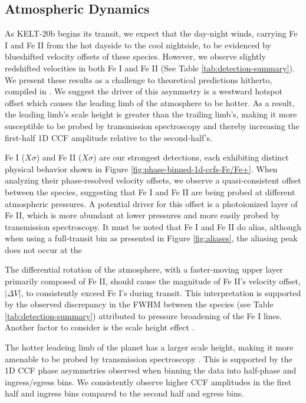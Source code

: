 \documentclass[twocolumn]{aastex631}
\begin{document}
            \clearpage
            
        \subsection{Atmospheric Dynamics}\label{subsec:Atmospheric Dynamics}
            As KELT-20b begins its transit, we expect that the day-night winds, carrying Fe I and Fe II from the hot dayside to the cool nightside, to be evidenced by blueshifted velocity offsets of these species. However, we observe slightly redshifted velocities in both Fe I and Fe II (See Table \ref{tab:detection-summary}). We present these results as a challenge to theoretical predictions hitherto, compiled in \citet{Savel2023}. We suggest the driver of this asymmetry is a westward hotspot offset which causes the leading limb of the atmosphere to be hotter. As a result, the leading limb's scale height is greater than the trailing limb's, making it more susceptible to be probed by transmission spectroscopy and thereby increasing the first-half 1D CCF amplitude relative to the second-half's.
    
            Fe I ($X\sigma$) and Fe II ($X\sigma$) are our strongest detections, each exhibiting distinct physical behavior shown in Figure \ref{fig:phase-binned-1d-ccfs-Fe/Fe+}. When analyzing their phase-resolved velocity offsets, we observe a quasi-consistent offset between the species, suggesting that Fe I and Fe II are being probed at different atmospheric pressures. A potential driver for this offset is a photoionized layer of Fe II, which is more abundant at lower pressures and more easily probed by transmission spectroscopy. It must be noted that Fe I and Fe II do alias, although when using a full-transit bin as presented in Figure \ref{fig:aliases}, the aliasing peak does not occur at the 
            
            The differential rotation of the atmosphere, with a faster-moving upper layer primarily composed of Fe II, should cause the magnitude of Fe II's velocity offset, $|\Delta V|$, to consistently exceed Fe I's during transit. This interpretation is supported by the observed discrepancy in the FWHM between the species (see Table \ref{tab:detection-summary}) attributed to pressure broadening of the Fe I lines. Another factor to consider is the scale height effect \citep{Savel2023}. 
            
            The hotter leadeing limb of the planet has a larger scale height, making it more amenable to be probed by transmission spectroscopy \citep{Prinoth2023}. This is supported by the 1D CCF phase asymmetries observed when binning the data into half-phase and ingress/egress bins. We consistently observe higher CCF amplitudes in the first half and ingress bins compared to the second half and egress bins.
\end{document}
